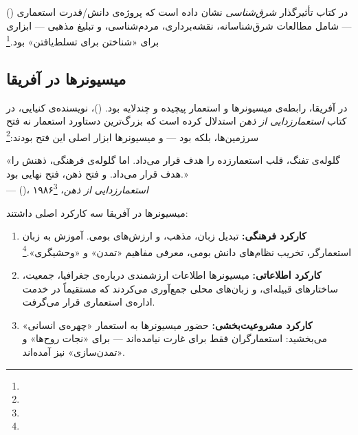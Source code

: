  () در کتاب تأثیرگذار \textit{شرق‌شناسی} نشان داده است که پروژه‌ی دانش/قدرت استعماری — شامل مطالعات شرق‌شناسانه، نقشه‌برداری، مردم‌شناسی، و تبلیغ مذهبی — ابزاری برای «شناختن برای تسلط‌یافتن» بود.\footnote{}

\subsection{میسیونرها در آفریقا}
\label{subsec:ch13-africa-missionaries}

در آفریقا، رابطه‌ی میسیونرها و استعمار پیچیده و چندلایه بود.  ()، نویسنده‌ی کنیایی، در کتاب \textit{استعمارزدایی از ذهن} استدلال کرده است که بزرگ‌ترین دستاورد استعمار نه فتح سرزمین‌ها، بلکه  بود — و میسیونرها ابزار اصلی این فتح بودند:\footnote{}

\begin{tcolorbox}[quotebox, title={نقل‌قول تاریخی}]
«گلوله‌ی تفنگ، قلب استعمارزده را هدف قرار می‌داد. اما گلوله‌ی فرهنگی، ذهنش را هدف قرار می‌داد. و فتح ذهن، فتح نهایی بود.»\\
—  ()، \textit{استعمارزدایی از ذهن}، ۱۹۸۶\footnote{}
\end{tcolorbox}

میسیونرها در آفریقا سه کارکرد اصلی داشتند:

\begin{enumerate}
\item \textbf{کارکرد فرهنگی:} تبدیل زبان، مذهب، و ارزش‌های بومی. آموزش به زبان استعمارگر، تخریب نظام‌های دانش بومی، معرفی مفاهیم «تمدن» و «وحشیگری».\footnote{}

\item \textbf{کارکرد اطلاعاتی:} میسیونرها اطلاعات ارزشمندی درباره‌ی جغرافیا، جمعیت، ساختارهای قبیله‌ای، و زبان‌های محلی جمع‌آوری می‌کردند که مستقیماً در خدمت اداره‌ی استعماری قرار می‌گرفت.

\item \textbf{کارکرد مشروعیت‌بخشی:} حضور میسیونرها به استعمار «چهره‌ی انسانی» می‌بخشید: استعمارگران فقط برای غارت نیامده‌اند — برای «نجات روح‌ها» و «تمدن‌سازی» نیز آمده‌اند.
\end{enumerate}

